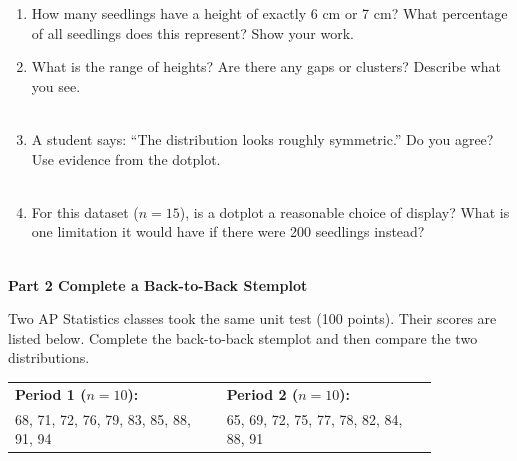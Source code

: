 \documentclass[10pt]{article}
\begin{document}
\begin{enumerate}[leftmargin=1.5em, itemsep=8pt]

  \item How many seedlings have a height of exactly 6 cm or 7 cm?
        \blank{2.5cm}
        What percentage of all seedlings does this represent?
        Show your work.\quad\blank{5cm}

  \item What is the range of heights? \blank{3cm}
        Are there any gaps or clusters? Describe what you see.\\[5pt]
        \writeline\\[1pt]\writeline

  \item A student says: ``The distribution looks roughly symmetric.''
        Do you agree? Use evidence from the dotplot.\\[5pt]
        \writeline\\[1pt]\writeline

  \item For this dataset ($n = 15$), is a dotplot a reasonable choice of display?
        What is one limitation it would have if there were 200 seedlings instead?\\[5pt]
        \writeline\\[1pt]\writeline

\end{enumerate}

\vspace{0.12in}

{\large\bfseries\color{navy} Part 2 \quad Complete a Back-to-Back Stemplot}

\vspace{0.1in}

\noindent\small Two AP Statistics classes took the same unit test (100 points). Their scores
are listed below. Complete the back-to-back stemplot and then compare the two distributions.

\vspace{0.1in}

\begin{center}
\small
\begin{tabular}{p{0.42\linewidth} p{0.42\linewidth}}
\textbf{Period 1 ($n = 10$):} & \textbf{Period 2 ($n = 10$):} \\
68, 71, 72, 76, 79, 83, 85, 88, 91, 94 & 65, 69, 72, 75, 77, 78, 82, 84, 88, 91 \\
\end{tabular}
\end{center}
\end{document}
